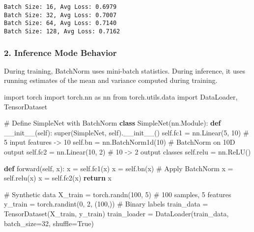 \documentclass[
  letterpaper,
  DIV=11,
  numbers=noendperiod]{scrreprt}
\newenvironment{Shaded}{\begin{snugshade}}{\end{snugshade}}
\newcommand{\BuiltInTok}[1]{\textcolor[rgb]{0.00,0.23,0.31}{#1}}
\newcommand{\CommentTok}[1]{\textcolor[rgb]{0.37,0.37,0.37}{#1}}
\newcommand{\ControlFlowTok}[1]{\textcolor[rgb]{0.00,0.23,0.31}{\textbf{#1}}}
\newcommand{\DecValTok}[1]{\textcolor[rgb]{0.68,0.00,0.00}{#1}}
\newcommand{\FunctionTok}[1]{\textcolor[rgb]{0.28,0.35,0.67}{#1}}
\newcommand{\ImportTok}[1]{\textcolor[rgb]{0.00,0.46,0.62}{#1}}
\newcommand{\KeywordTok}[1]{\textcolor[rgb]{0.00,0.23,0.31}{\textbf{#1}}}
\newcommand{\NormalTok}[1]{\textcolor[rgb]{0.00,0.23,0.31}{#1}}
\newcommand{\OperatorTok}[1]{\textcolor[rgb]{0.37,0.37,0.37}{#1}}
\newcommand{\VariableTok}[1]{\textcolor[rgb]{0.07,0.07,0.07}{#1}}
\begin{document}
\begin{verbatim}
Batch Size: 16, Avg Loss: 0.6979
Batch Size: 32, Avg Loss: 0.7007
Batch Size: 64, Avg Loss: 0.7140
Batch Size: 128, Avg Loss: 0.7162
\end{verbatim}

\subsubsection{2. Inference Mode
Behavior}\label{inference-mode-behavior}

During training, BatchNorm uses mini-batch statistics. During inference,
it uses running estimates of the mean and variance computed during
training.

\begin{Shaded}
\begin{Highlighting}[]
\ImportTok{import}\NormalTok{ torch}
\ImportTok{import}\NormalTok{ torch.nn }\ImportTok{as}\NormalTok{ nn}
\ImportTok{from}\NormalTok{ torch.utils.data }\ImportTok{import}\NormalTok{ DataLoader, TensorDataset}

\CommentTok{\# Define SimpleNet with BatchNorm}
\KeywordTok{class}\NormalTok{ SimpleNet(nn.Module):}
    \KeywordTok{def} \FunctionTok{\_\_init\_\_}\NormalTok{(}\VariableTok{self}\NormalTok{):}
        \BuiltInTok{super}\NormalTok{(SimpleNet, }\VariableTok{self}\NormalTok{).}\FunctionTok{\_\_init\_\_}\NormalTok{()}
        \VariableTok{self}\NormalTok{.fc1 }\OperatorTok{=}\NormalTok{ nn.Linear(}\DecValTok{5}\NormalTok{, }\DecValTok{10}\NormalTok{)  }\CommentTok{\# 5 input features {-}\textgreater{} 10}
        \VariableTok{self}\NormalTok{.bn }\OperatorTok{=}\NormalTok{ nn.BatchNorm1d(}\DecValTok{10}\NormalTok{)  }\CommentTok{\# BatchNorm on 10D output}
        \VariableTok{self}\NormalTok{.fc2 }\OperatorTok{=}\NormalTok{ nn.Linear(}\DecValTok{10}\NormalTok{, }\DecValTok{2}\NormalTok{)  }\CommentTok{\# 10 {-}\textgreater{} 2 output classes}
        \VariableTok{self}\NormalTok{.relu }\OperatorTok{=}\NormalTok{ nn.ReLU()}

    \KeywordTok{def}\NormalTok{ forward(}\VariableTok{self}\NormalTok{, x):}
\NormalTok{        x }\OperatorTok{=} \VariableTok{self}\NormalTok{.fc1(x)}
\NormalTok{        x }\OperatorTok{=} \VariableTok{self}\NormalTok{.bn(x)  }\CommentTok{\# Apply BatchNorm}
\NormalTok{        x }\OperatorTok{=} \VariableTok{self}\NormalTok{.relu(x)}
\NormalTok{        x }\OperatorTok{=} \VariableTok{self}\NormalTok{.fc2(x)}
        \ControlFlowTok{return}\NormalTok{ x}

\CommentTok{\# Synthetic data}
\NormalTok{X\_train }\OperatorTok{=}\NormalTok{ torch.randn(}\DecValTok{100}\NormalTok{, }\DecValTok{5}\NormalTok{)  }\CommentTok{\# 100 samples, 5 features}
\NormalTok{y\_train }\OperatorTok{=}\NormalTok{ torch.randint(}\DecValTok{0}\NormalTok{, }\DecValTok{2}\NormalTok{, (}\DecValTok{100}\NormalTok{,))  }\CommentTok{\# Binary labels}
\NormalTok{train\_data }\OperatorTok{=}\NormalTok{ TensorDataset(X\_train, y\_train)}
\NormalTok{train\_loader }\OperatorTok{=}\NormalTok{ DataLoader(train\_data, batch\_size}\OperatorTok{=}\DecValTok{32}\NormalTok{, shuffle}\OperatorTok{=}\VariableTok{True}\NormalTok{)}


\end{Highlighting}
\end{Shaded}
\end{document}
